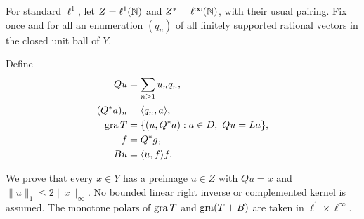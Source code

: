 For standard $\ell^1$, let $Z=\ell^1(\mathbb N)$ and $Z^*=\ell^\infty(\mathbb N)$,
with their usual pairing. Fix once and for all an enumeration $(q_n)$ of
all finitely supported rational vectors in the closed unit ball of $Y$.
\begin{definition}
Define
\begin{equation}
\begin{aligned}
Qu&=\sum_{n\ge1}u_nq_n,\\
(Q^*a)_n&=\langle q_n,a\rangle,\\
\operatorname{gra} T&=\{(u,Q^*a):a\in D,\ Qu=La\},\\
f&=Q^*g,\\
Bu&=\langle u,f\rangle f.
\end{aligned}
\label{eq:D10}
\end{equation}
\end{definition}
We prove that every $x\in Y$ has a preimage $u\in Z$ with
$Qu=x$ and $\|u\|_1\le2\|x\|_\infty$. No bounded linear
right inverse or complemented kernel is assumed. The monotone polars of $\operatorname{gra} T$ and $\operatorname{gra}(T+B)$ are taken in
$\ell^1\times\ell^\infty$.

